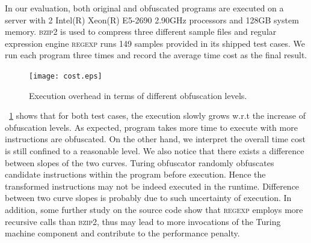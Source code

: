 In our evaluation, both original and obfuscated programs are executed on a
server with 2 Intel(R) Xeon(R) E5-2690 2.90GHz processors and 128GB system
memory. \textsc{bzip2} is used to compress three different sample files and
regular expression engine \textsc{regexp} runs 149 samples provided in its
shipped test cases. We run each program three times and record the average
time cost as the final result.

\begin{figure}
  \texttt{[image: cost.eps]}
  \caption{Execution overhead in terms of different obfuscation levels.}
  \label{fig:cost}
\end{figure}

\F~\ref{fig:cost} shows that for both test cases, the execution slowly grows
w.r.t the increase of obfuscation levels. As expected, program takes more time
to execute with more instructions are obfuscated. On the other hand, we
interpret the overall time cost is still confined to a reasonable level. We also
notice that there exists a difference between slopes of the two curves. Turing
obfuscator randomly obfuscates candidate instructions within the program before
execution. Hence the transformed instructions may not be indeed executed in the
runtime. Difference between two curve slopes is probably due to such uncertainty
of execution. In addition, some further study on the source code show that
\textsc{regexp} employs more recursive calls than \textsc{bzip2}, thus may lead
to more invocations of the Turing machine component and contribute to the
performance penalty.
